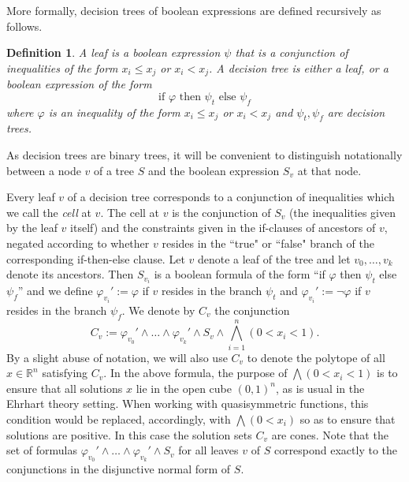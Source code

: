 \documentclass[12pt,reqno]{amsart}
\newtheorem{definition}{Definition}
\numberwithin{definition}{section}
\theoremstyle{definition}
\newcommand{\RR}{\mathbb{R}}
\begin{document}
More formally, decision trees of boolean expressions are defined recursively as follows.

\begin{definition} A \emph{leaf} is a boolean expression $\psi$ that is a conjunction of inequalities of the form $x_i \leq x_j$ or $x_i < x_j$. A \emph{decision tree} is either a leaf, or a boolean expression of the form
\[
  \text{if $\varphi$ then $\psi_t$ else $\psi_f$}
\]
where $\varphi$ is an inequality of the form $x_i \leq x_j$ or $x_i < x_j$ and $\psi_t,\psi_f$ are decision trees.
\end{definition}

As decision trees are binary trees, it will be convenient to distinguish notationally between a node $v$ of a tree $S$ and the boolean expression $S_v$ at that node.

Every leaf $v$ of a decision tree corresponds to a conjunction of inequalities which we call the \emph{cell} at $v$. The cell at $v$ is the conjunction of $S_v$ (the inequalities given by the leaf $v$ itself) and the constraints given in the if-clauses of ancestors of $v$, negated according to whether $v$ resides in the ``true" or ``false" branch of the corresponding if-then-else clause. Let $v$ denote a leaf of the tree and let $v_0,\ldots,v_k$ denote its ancestors. Then $S_{v_i}$ is a boolean formula of the form ``if $\varphi$ then $\psi_t$ else $\psi_f$'' and we define $\varphi_{v_i}' := \varphi$ if $v$ resides in the branch $\psi_t$ and $\varphi_{v_i}' := \neg\varphi$ if $v$ resides in the branch $\psi_f$. We denote by $C_v$ the conjunction
\[
 C_v := \varphi_{v_0}'\wedge\ldots\wedge\varphi_{v_k}'\wedge S_v\wedge \bigwedge_{i=1}^n (0 < x_i < 1).
\]
By a slight abuse of notation, we will also use $C_v$ to denote the polytope of all $x\in \RR^n$ satisfying $C_v$. In the above formula, the purpose of $\bigwedge (0 < x_i <1)$ is to ensure that all solutions $x$ lie in the open cube $(0,1)^n$, as is usual in the Ehrhart theory setting. When working with quasisymmetric functions, this condition would be replaced, accordingly, with $\bigwedge (0 < x_i)$ so as to ensure that solutions are positive. In this case the solution sets $C_v$ are cones. Note that the set of formulas $\varphi_{v_0}'\wedge\ldots\wedge\varphi_{v_k}'\wedge S_v$ for all leaves $v$ of $S$ correspond exactly to the conjunctions in the disjunctive normal form of $S$.
\end{document}
